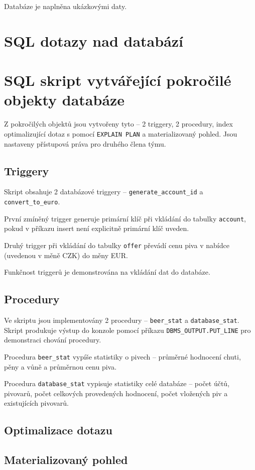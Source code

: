 \documentclass[a4paper, 11pt]{article}
\begin{document}
Databáze je naplněna ukázkovými daty.

\section{SQL dotazy nad databází}

\section{SQL skript vytvářející pokročilé objekty databáze}
Z pokročilých objektů jsou vytvořeny tyto – 2 triggery, 2 procedury, index optimalizující dotaz s pomocí \texttt{EXPLAIN PLAN} a materializovaný pohled. Jsou nastaveny přístupová práva pro druhého člena týmu.

\subsection{Triggery}
Skript obsahuje 2 databázové triggery – \texttt{generate\_account\_id} a \texttt{convert\_to\_euro}.


První zmíněný trigger generuje primární klíč při vkládání do tabulky \texttt{account}, pokud v příkazu insert není explicitně primární klíč uveden.


Druhý trigger při vkládání do tabulky \texttt{offer} převádí cenu piva v nabídce (uvedenou v měně CZK) do měny EUR. 


Funkčnost triggerů je demonstrována na vkládání dat do databáze. 

\subsection{Procedury}
Ve skriptu jsou implementovány 2 procedury – \texttt{beer\_stat} a \texttt{database\_stat}. 
Skript produkuje výstup do konzole pomocí příkazu \texttt{DBMS\_OUTPUT.PUT\_LINE} pro demonstraci chování procedury. 


Procedura \texttt{beer\_stat} vypíše statistiky o pivech – průměrné hodnocení chuti, pěny a vůně a průměrnou cenu piva. 


Procedura \texttt{database\_stat} vypisuje statistiky celé databáze – počet účtů, pivovarů, počet celkových provedených hodnocení, počet vložených piv a existujících pivovarů. 

\subsection{Optimalizace dotazu}

\subsection{Materializovaný pohled}
\end{document}
